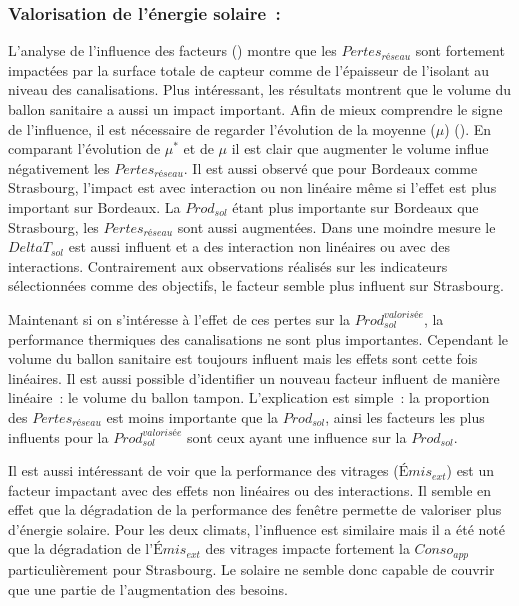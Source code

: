 \subsubsection{Valorisation de l’énergie solaire~:} %
\label{ssub:valorisation_de_l_energie_solaire_}
L’analyse de l’influence des facteurs () montre que
les $Pertes_{réseau}$ sont fortement impactées par la surface totale de capteur comme de
l’épaisseur de l’isolant au niveau des canalisations. Plus intéressant, les résultats
montrent que le volume du ballon sanitaire a aussi un impact important. Afin de mieux
comprendre le signe de l’influence, il est nécessaire de regarder l’évolution de la
moyenne ($\mu$) (). En comparant l’évolution de
$\mu^{*}$ et de $\mu$ il est clair que augmenter le volume influe négativement les
$Pertes_{réseau}$. Il est aussi observé que pour Bordeaux comme Strasbourg, l’impact est
avec interaction ou non linéaire même si l’effet est plus important sur Bordeaux. La
$Prod_{sol}$ étant plus importante sur Bordeaux que Strasbourg, les $Pertes_{réseau}$ sont
aussi augmentées. Dans une moindre mesure le $DeltaT_{sol}$ est aussi influent et a des
interaction non linéaires ou avec des interactions. Contrairement aux observations
réalisés sur les indicateurs sélectionnées comme des objectifs, le facteur semble plus
influent sur Strasbourg.

Maintenant si on s’intéresse à l’effet de ces pertes sur la $Prod_{sol}^{valorisée}$, la
performance thermiques des canalisations ne sont plus importantes. Cependant le volume du
ballon sanitaire est toujours influent mais les effets sont cette fois linéaires. Il est
aussi possible d’identifier un nouveau facteur influent de manière linéaire~: le volume du
ballon tampon. L’explication est simple~: la proportion des $Pertes_{réseau}$ est moins
importante que la $Prod_{sol}$, ainsi les facteurs les plus influents pour la
$Prod_{sol}^{valorisée}$ sont ceux ayant une influence sur la $Prod_{sol}$.

Il est aussi intéressant de voir que la performance des vitrages ($Émis_{ext}$) est un
facteur impactant avec des effets non linéaires ou des interactions. Il semble en effet
que la dégradation de la performance des fenêtre permette de valoriser plus d’énergie
solaire. Pour les deux climats, l’influence est similaire mais il a été noté que la
dégradation de l’$Émis_{ext}$ des vitrages impacte fortement la $Conso_{app}$
particulièrement pour Strasbourg. Le solaire ne semble donc capable de couvrir que une
partie de l’augmentation des besoins.


